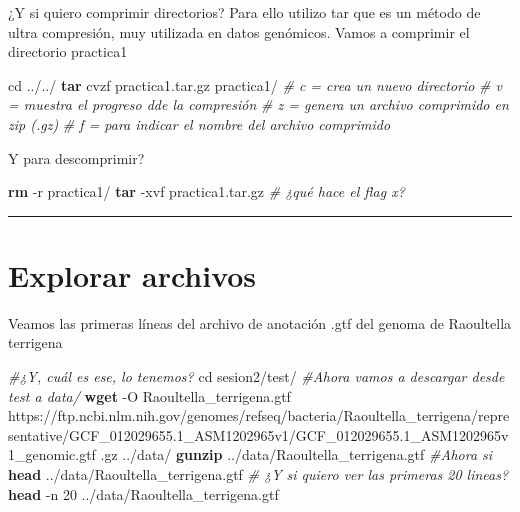 \documentclass[
]{book}
\newenvironment{Shaded}{\begin{snugshade}}{\end{snugshade}}
\newcommand{\AttributeTok}[1]{\textcolor[rgb]{0.13,0.29,0.53}{#1}}
\newcommand{\BuiltInTok}[1]{#1}
\newcommand{\CommentTok}[1]{\textcolor[rgb]{0.56,0.35,0.01}{\textit{#1}}}
\newcommand{\ExtensionTok}[1]{#1}
\newcommand{\FunctionTok}[1]{\textcolor[rgb]{0.13,0.29,0.53}{\textbf{#1}}}
\newcommand{\NormalTok}[1]{#1}
\begin{document}
¿Y si quiero comprimir directorios? Para ello utilizo tar que es un método de ultra
compresión, muy utilizada en datos genómicos. Vamos a comprimir el directorio practica1

\begin{Shaded}
\begin{Highlighting}[]
\BuiltInTok{cd}\NormalTok{ ../../}
\FunctionTok{tar}\NormalTok{ cvzf practica1.tar.gz practica1/}
\CommentTok{\# c = crea un nuevo directorio}
\CommentTok{\# v = muestra el progreso dde la compresión}
\CommentTok{\# z = genera un archivo comprimido en zip (.gz)}
\CommentTok{\# f = para indicar el nombre del archivo comprimido}
\end{Highlighting}
\end{Shaded}

Y para descomprimir?

\begin{Shaded}
\begin{Highlighting}[]
\FunctionTok{rm} \AttributeTok{{-}r}\NormalTok{ practica1/}
\FunctionTok{tar} \AttributeTok{{-}xvf}\NormalTok{ practica1.tar.gz}
\CommentTok{\# ¿qué hace el flag x?}
\end{Highlighting}
\end{Shaded}

\begin{center}\rule{0.5\linewidth}{0.5pt}\end{center}

\section{Explorar archivos}\label{explorar-archivos}

Veamos las primeras líneas del archivo de anotación .gtf del genoma de Raoultella terrigena

\begin{Shaded}
\begin{Highlighting}[]
\CommentTok{\#¿Y, cuál es ese, lo tenemos?}
\BuiltInTok{cd}\NormalTok{ sesion2/test/}
\CommentTok{\#Ahora vamos a descargar desde test a data/}
\FunctionTok{wget} \AttributeTok{{-}O}\NormalTok{ Raoultella\_terrigena.gtf}
\ExtensionTok{https://ftp.ncbi.nlm.nih.gov/genomes/refseq/bacteria/Raoultella\_terrigena/repre}
\ExtensionTok{sentative/GCF\_012029655.1\_ASM1202965v1/GCF\_012029655.1\_ASM1202965v1\_genomic.gtf}
\ExtensionTok{.gz}\NormalTok{ ../data/}
\FunctionTok{gunzip}\NormalTok{ ../data/Raoultella\_terrigena.gtf}
\CommentTok{\#Ahora si}
\FunctionTok{head}\NormalTok{ ../data/Raoultella\_terrigena.gtf}
\CommentTok{\# ¿Y si quiero ver las primeras 20 lineas?}
\FunctionTok{head} \AttributeTok{{-}n}\NormalTok{ 20 ../data/Raoultella\_terrigena.gtf}
\end{Highlighting}
\end{Shaded}
\end{document}
